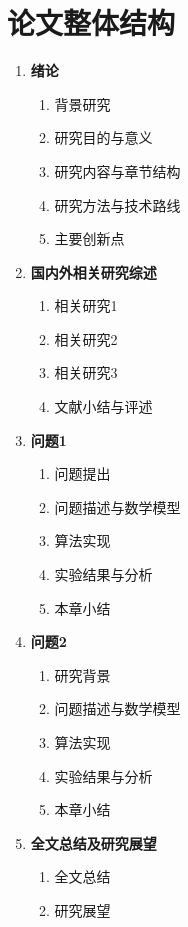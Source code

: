 \documentclass[draftformat,mathCMR]{HUSTthesis}
\begin{document}
\section{论文整体结构}
\def\labelenumi{\textbf{\theenumi} }\def\theenumi{\arabic{enumi}}
\def\labelenumii{\theenumi.\theenumii }\def\theenumii{\arabic{enumii}}
\begin{mdframed}[everyline=true]\label{enum}
	\begin{enumerate}
		\item \textbf{绪论}
		\begin{enumerate}
			\item 背景研究
			\item 研究目的与意义
			\item 研究内容与章节结构
			\item 研究方法与技术路线
			\item 主要创新点
		\end{enumerate}
		\item \textbf{国内外相关研究综述}
		\begin{enumerate}
			\item 相关研究1
			\item 相关研究2
			\item 相关研究3\\%
		
			\item 文献小结与评述
		\end{enumerate}
		\item \textbf{问题1}
		\begin{enumerate}
			\item 问题提出
			\item 问题描述与数学模型
			\item 算法实现
			\item 实验结果与分析
			\item 本章小结
		\end{enumerate}
		\item \textbf{问题2}
		\begin{enumerate}
			\item 研究背景
			\item 问题描述与数学模型
			\item 算法实现
			\item 实验结果与分析
			\item 本章小结
		\end{enumerate}
		\item \textbf{全文总结及研究展望}
		\begin{enumerate}
			\item 全文总结
			\item 研究展望
		\end{enumerate}
	\end{enumerate}
\end{mdframed}
\end{document}
